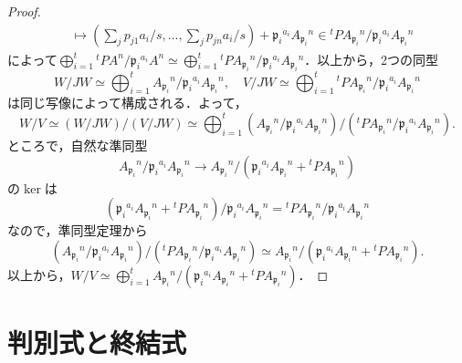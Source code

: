\begin{proof}
\begin{align*}
    &\mapsto \left(\sum_jp_{j1}a_i/s, \ldots, \sum_jp_{jn}a_i/s\right) + \mathfrak{p}_i{}^{a_i}A_{\mathfrak{p}_i}{}^n\in{}^tPA_{\mathfrak{p}_i}{}^n/\mathfrak{p}_i{}^{a_i}A_{\mathfrak{p}_i}{}^n
  \end{align*}
  によって$\bigoplus_{i = 1}^t{}^tPA^n/\mathfrak{p}_i{}^{a_i}A^n\simeq\bigoplus_{i = 1}^t{}^tPA_{\mathfrak{p}_i}{}^n/\mathfrak{p}_i{}^{a_i}A_{\mathfrak{p}_i}{}^n$．以上から，2つの同型
  \[W/JW\simeq\bigoplus_{i = 1}^tA_{\mathfrak{p}_i}{}^n/\mathfrak{p}_i{}^{a_i}A_{\mathfrak{p}_i}{}^n, \quad V/JW\simeq\bigoplus_{i = 1}^t{}^tPA_{\mathfrak{p}_i}{}^n/\mathfrak{p}_i{}^{a_i}A_{\mathfrak{p}_i}{}^n\]
  は同じ写像によって構成される．よって，
  \[W/V\simeq(W/JW)/(V/JW)\simeq\bigoplus_{i = 1}^t(A_{\mathfrak{p}_i}{}^n/\mathfrak{p}_i{}^{a_i}A_{\mathfrak{p}_i}{}^n)/(^tPA_{\mathfrak{p}_i}{}^n/\mathfrak{p}_i{}^{a_i}A_{\mathfrak{p}_i}{}^n).\]
  ところで，自然な準同型
  \[A_{\mathfrak{p}_i}{}^n/\mathfrak{p}_i{}^{a_i}A_{\mathfrak{p}_i}{}^n\to A_{\mathfrak{p}_i}{}^n/(\mathfrak{p}_i{}^{a_i}A_{\mathfrak{p}_i}{}^n + {}^tPA_{\mathfrak{p}_i}{}^n)\]
  の$\ker$は
  \[(\mathfrak{p}_i{}^{a_i}A_{\mathfrak{p}_i}{}^n + {}^tPA_{\mathfrak{p}_i}{}^n)/\mathfrak{p}_i{}^{a_i}A_{\mathfrak{p}_i}{}^n = {}^tPA_{\mathfrak{p}_i}{}^n/\mathfrak{p}_i{}^{a_i}A_{\mathfrak{p}_i}{}^n\]
  なので，準同型定理から
  \[(A_{\mathfrak{p}_i}{}^n/\mathfrak{p}_i{}^{a_i}A_{\mathfrak{p}_i}{}^n)/(^tPA_{\mathfrak{p}_i}{}^n/\mathfrak{p}_i{}^{a_i}A_{\mathfrak{p}_i}{}^n)\simeq A_{\mathfrak{p}_i}{}^n/(\mathfrak{p}_i{}^{a_i}A_{\mathfrak{p}_i}{}^n + {}^tPA_{\mathfrak{p}_i}{}^n).\]
  以上から，$W/V\simeq \bigoplus_{i = 1}^tA_{\mathfrak{p}_i}{}^n/(\mathfrak{p}_i{}^{a_i}A_{\mathfrak{p}_i}{}^n + {}^tPA_{\mathfrak{p}_i}{}^n)$．
\end{proof}

\section{判別式と終結式}
